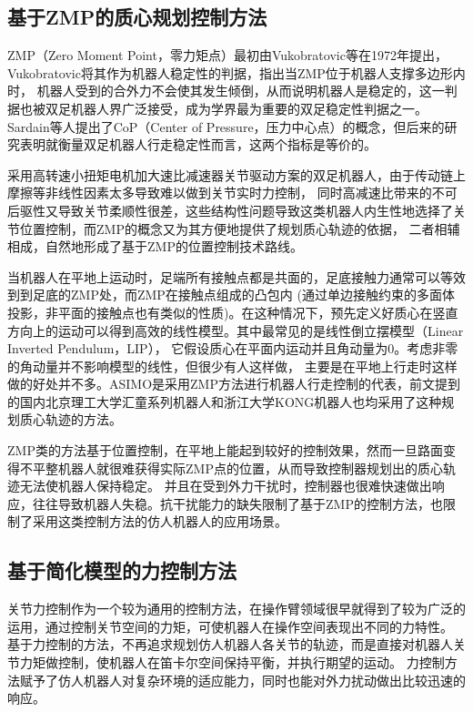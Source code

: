 \subsection{基于ZMP的质心规划控制方法}
ZMP（Zero Moment Point，零力矩点）最初由Vukobratovic等在1972年提出\cite{vukobratovic2004zero}，Vukobratovic将其作为机器人稳定性的判据，指出当ZMP位于机器人支撑多边形内时，
机器人受到的合外力不会使其发生倾倒，从而说明机器人是稳定的，这一判据也被双足机器人界广泛接受，成为学界最为重要的双足稳定性判据之一。
Sardain等人提出了CoP（Center of Pressure，压力中心点）的概念，但后来的研究表明就衡量双足机器人行走稳定性而言，这两个指标是等价的。

采用高转速小扭矩电机加大速比减速器关节驱动方案的双足机器人，由于传动链上摩擦等非线性因素太多导致难以做到关节实时力控制，
同时高减速比带来的不可后驱性又导致关节柔顺性很差，这些结构性问题导致这类机器人内生性地选择了关节位置控制，而ZMP的概念又为其方便地提供了规划质心轨迹的依据，
二者相辅相成，自然地形成了基于ZMP的位置控制技术路线。

当机器人在平地上运动时，足端所有接触点都是共面的，足底接触力通常可以等效到到足底的ZMP处，而ZMP在接触点组成的凸包内\cite{wieber2002stability}
(通过单边接触约束的多面体投影，非平面的接触点也有类似的性质\cite{caron2016zmp})。在这种情况下，预先定义好质心在竖直方向上的运动可以得到高效的线性模型。其中最常见的是线性倒立摆模型（Linear Inverted Pendulum，LIP），
它假设质心在平面内运动并且角动量为0\cite{kajita1991study}。考虑非零的角动量并不影响模型的线性，但很少有人这样做，
主要是在平地上行走时这样做的好处并不多\cite{koolen2012capturability}。ASIMO是采用ZMP方法进行机器人行走控制的代表，前文提到的国内北京理工大学汇童系列机器人和浙江大学KONG机器人也均采用了这种规划质心轨迹的方法。

ZMP类的方法基于位置控制，在平地上能起到较好的控制效果，然而一旦路面变得不平整机器人就很难获得实际ZMP点的位置，从而导致控制器规划出的质心轨迹无法使机器人保持稳定。
并且在受到外力干扰时，控制器也很难快速做出响应，往往导致机器人失稳。抗干扰能力的缺失限制了基于ZMP的控制方法，也限制了采用这类控制方法的仿人机器人的应用场景。

\subsection{基于简化模型的力控制方法}
关节力控制作为一个较为通用的控制方法，在操作臂领域很早就得到了较为广泛的运用，通过控制关节空间的力矩，可使机器人在操作空间表现出不同的力特性。
基于力控制的方法，不再追求规划仿人机器人各关节的轨迹，而是直接对机器人关节力矩做控制，使机器人在笛卡尔空间保持平衡，并执行期望的运动。
力控制方法赋予了仿人机器人对复杂环境的适应能力，同时也能对外力扰动做出比较迅速的响应。

